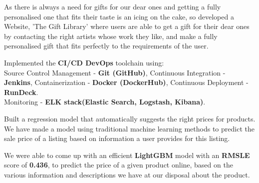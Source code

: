 \documentclass[]{essdee-resume}
\begin{document}
\begin{minipage}[t]{0.66\textwidth}
\begin{tightemize}
\item As there is always a need for gifts for our dear ones and getting a fully personalised one that fits their taste is an icing on the cake, so developed a Website, 'The Gift Library' where users are able to get a gift for their dear ones by contacting the right artists whose work they like, and make a fully personalised gift that fits perfectly to the requirements of the user.
\item Implemented the \textbf{CI/CD DevOps} toolchain using: \\
Source Control Management - \textbf{Git (GitHub)}, 
Continuous Integration - \textbf{Jenkins}, 
Containerization - \textbf{Docker (DockerHub)},
Continuous Deployment - \textbf{RunDeck}.\\
Monitoring - \textbf{ELK stack(Elastic Search, Logstash, Kibana)}.
\end{tightemize}
\sectionsep


\begin{tightemize}
\item Built a regression model that automatically suggests the right prices for products. We have made a model using traditional machine learning methods to predict the sale price of a listing based on information a user provides for this listing.
\item We  were  able  to  come up  with  an  efficient \textbf{LightGBM} model  with an  \textbf{RMSLE} score of \textbf{0.436}, to predict the price of a given product online, based on the various information and descriptions we have at our disposal about the product.
\end{tightemize}
\sectionsep








\end{minipage}
\end{document}
